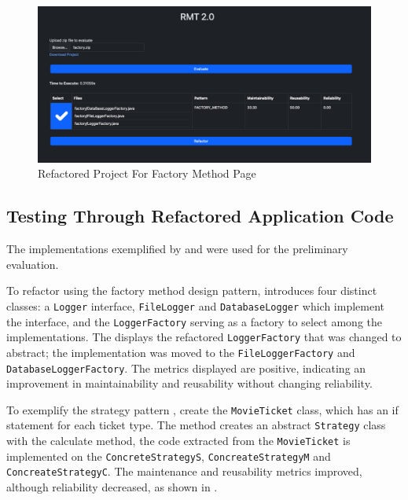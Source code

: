 \begin{figure}[ht!]
\SetCaptionWidth{\textwidth}
\caption{Refactored Project For Factory Method Page}
\label{fig-factory-client}
\includegraphics[width =\textwidth]{Chapter-5/Figures/rmt-factory-refactored.png}
\end{figure}
\FloatBarrier

\subsection{Testing Through Refactored Application Code}
\label{sub-testing-article}

The implementations exemplified by \textcite{Liu2014} and \textcite{zafeiris2017automated} were used for the preliminary evaluation.

To refactor using the factory method design pattern, \textcite{Liu2014} introduces four distinct classes: a \texttt{Logger} interface, 	\texttt{FileLogger} and \texttt{DatabaseLogger} which implement the interface, and the \texttt{LoggerFactory} serving as a factory to select among the implementations. The  displays the refactored \texttt{LoggerFactory} that was changed to abstract; the implementation was moved to the \texttt{FileLoggerFactory} and \texttt{DatabaseLoggerFactory}. The metrics displayed are positive, indicating an improvement in maintainability and reusability without changing reliability.

To exemplify the strategy pattern \textcite{Liu2014}, create the \texttt{MovieTicket} class, which has an if statement for each ticket type. The method creates an abstract \texttt{Strategy} class with the calculate method, the code extracted from the \texttt{MovieTicket} is implemented on the \texttt{ConcreteStrategyS}, \texttt{ConcreateStrategyM} and \texttt{ConcreateStrategyC}. The maintenance and reusability metrics improved, although reliability decreased, as shown in .

